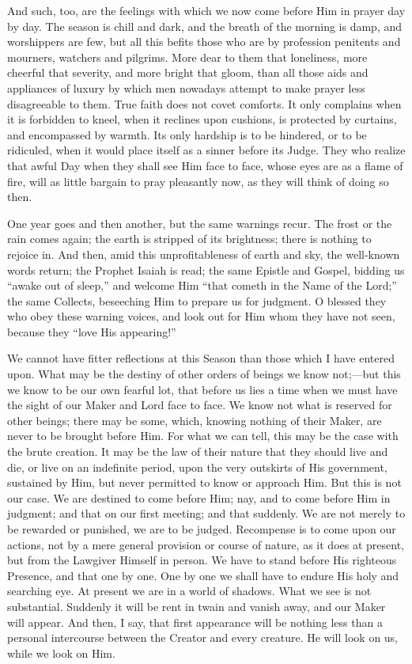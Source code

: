 And such, too, are the feelings with which we now come before Him
in prayer day by day. The season is chill and dark, and the breath of
the morning is damp, and worshippers are few, but all this befits
those who are by profession penitents and mourners, watchers and
pilgrims. More dear to them that loneliness, more cheerful that
severity, and more bright that gloom, than all those aids and
appliances of luxury by which men nowadays attempt to make prayer less
disagreeable to them. True faith does not covet comforts. It only
complains when it is forbidden to kneel, when it reclines upon
cushions, is protected by curtains, and encompassed by warmth. Its
only hardship is to be hindered, or to be ridiculed, when it would
place itself as a sinner before its Judge. They who realize that awful
Day when they shall see Him face to face, whose eyes are as a flame of
fire, will as little bargain to pray pleasantly now, as they will
think of doing so then.

One year goes and then another, but the same warnings recur. The
frost or the rain comes again; the earth is stripped of its
brightness; there is nothing to rejoice in. And then, amid this
unprofitableness of earth and sky, the well-known words return; the
Prophet Isaiah is read; the same Epistle and Gospel, bidding us
``awake out of sleep,'' and welcome Him ``that cometh in
the Name of the Lord;'' the same Collects, beseeching Him to
prepare us for judgment. O blessed they who obey these warning voices,
and look out for Him whom they have not seen, because they ``love
His appearing!''

We cannot have fitter reflections at this Season than those which I
have entered upon. What may be the destiny of other orders of beings
we know not;—but this we know to be our own fearful lot, that before
us lies a time when we must have the sight of our Maker and Lord face
to face. We know not what is reserved for other beings; there may be
some, which, knowing nothing of their Maker, are never to be brought
before Him. For what we can tell, this may be the case with the brute
creation. It may be the law of their nature that they should live and
die, or live on an indefinite period, upon the very outskirts of His
government, sustained by Him, but never permitted to know or approach
Him. But this is not our case. We are destined to come before Him;
nay, and to come before Him in judgment; and that on our first
meeting; and that suddenly. We are not merely to be rewarded or punished, we are to be judged. Recompense is to come upon our actions,
not by a mere general provision or course of nature, as it does at
present, but from the Lawgiver Himself in person. We have to stand
before His righteous Presence, and that one by one. One by one we
shall have to endure His holy and searching eye. At present we are in
a world of shadows. What we see is not substantial. Suddenly it will
be rent in twain and vanish away, and our Maker will appear. And then,
I say, that first appearance will be nothing less than a personal
intercourse between the Creator and every creature. He will look on
us, while we look on Him.

